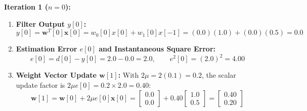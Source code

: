 \documentclass[11pt,a4paper]{article}
\begin{document}
\noindent\textbf{Iteration 1 ($n = 0$):}
\begin{enumerate}
    \item \textbf{Filter Output $y[0]$:}
    \begin{equation}
    y[0] = \mathbf{w}^T[0] \mathbf{x}[0] = w_0[0]x[0] + w_1[0]x[-1] = (0.0)(1.0) + (0.0)(0.5) = \mathbf{0.0}
    \end{equation}
    \item \textbf{Estimation Error $e[0]$ and Instantaneous Square Error:}
    \begin{equation}
    e[0] = d[0] - y[0] = 2.0 - 0.0 = \mathbf{2.0}, \qquad e^2[0] = (2.0)^2 = \mathbf{4.00}
    \end{equation}
    \item \textbf{Weight Vector Update $\mathbf{w}[1]$:}
    With $2\mu = 2(0.1) = 0.2$, the scalar update factor is $2\mu e[0] = 0.2 \times 2.0 = \mathbf{0.40}$:
    \begin{equation}
    \mathbf{w}[1] = \mathbf{w}[0] + 2\mu e[0] \mathbf{x}[0] = \begin{bmatrix} 0.0 \\ 0.0 \end{bmatrix} + 0.40 \begin{bmatrix} 1.0 \\ 0.5 \end{bmatrix} = \mathbf{\begin{bmatrix} 0.40 \\ 0.20 \end{bmatrix}}
    \end{equation}
\end{enumerate}
\end{document}
